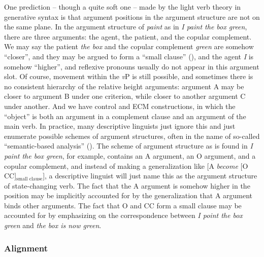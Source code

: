 \documentclass[UTF8, a4paper, oneside, scheme=plain]{ctexart}
\newcommand*{\term}[1]{\emph{#1}}
\newcommand*{\corpus}[1]{\emph{#1}}
\newcommand*{\vP}{\textit{v}P}
\begin{document}
One prediction -- though a quite soft one -- 
made by the light verb theory in generative syntax 
is that argument positions in the argument structure are not on the same plane.
In the argument structure of \corpus{paint} as in \corpus{I paint the box green},
there are three arguments:
the agent, the patient, and the copular complement.
We may say the patient \corpus{the box} and the copular complement \corpus{green} 
are somehow ``closer'',
and they may be argued to form a ``small clause'' (),
and the agent \corpus{I} is somehow ``higher'',
and reflexive pronouns usually do not appear in this argument slot.
Of course, movement within the \vP{} is still possible,
and sometimes there is no consistent hierarchy of the relative height arguments:
argument A may be closer to argument B under one criterion,
while closer to another argument C under another.
And we have control and ECM constructions,
in which the ``object'' is both an argument in a complement clause and 
an argument of the main verb.
In practice, many descriptive linguists just ignore this 
and just enumerate possible schemes of argument structures,
often in the name of so-called ``semantic-based analysis'' ().
The scheme of argument structure as is found in \corpus{I paint the box green}, for example,
contains an A argument, an O argument, and a copular complement,
and instead of making a generalization like [A \term{become} [O CC]$_{\text{small clause}}$],
a descriptive linguist will just name this as 
the argument structure of state-changing verb. %
The fact that the A argument is somehow higher in the position may be implicitly accounted for 
by the generalization that A argument binds other arguments.
The fact that O and CC form a small clause may be accounted for 
by emphasizing on the correspondence between 
\corpus{I point the box green} and \corpus{the box is now green}. 

\subsubsection{Alignment}
\end{document}
